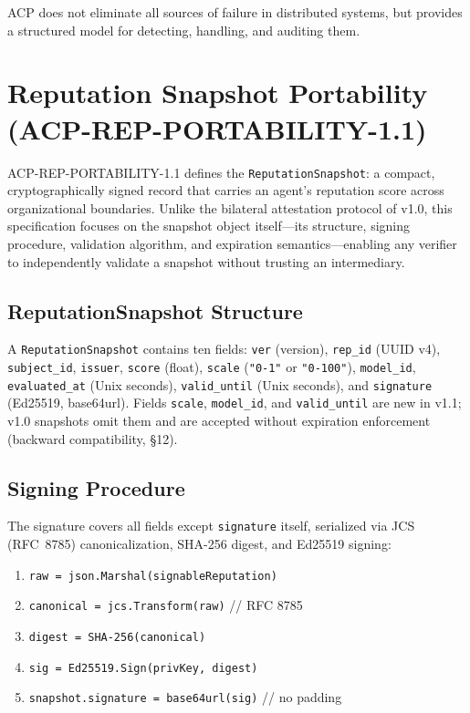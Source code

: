 \documentclass[11pt]{article}
\theoremstyle{definition}
\begin{document}
ACP does not eliminate all sources of failure in distributed systems,
but provides a structured model for detecting, handling, and auditing them.

\section{Reputation Snapshot Portability (ACP-REP-PORTABILITY-1.1)}

ACP-REP-PORTABILITY-1.1 defines the \texttt{ReputationSnapshot}: a compact, cryptographically signed record that carries an agent's reputation score across organizational boundaries.
Unlike the bilateral attestation protocol of v1.0, this specification focuses on the snapshot object itself---its structure, signing procedure, validation algorithm, and expiration semantics---enabling any verifier to independently validate a snapshot without trusting an intermediary.

\subsection{ReputationSnapshot Structure}

A \texttt{ReputationSnapshot} contains ten fields: \texttt{ver} (version), \texttt{rep\_id} (UUID v4), \texttt{subject\_id}, \texttt{issuer}, \texttt{score} (float), \texttt{scale} (\texttt{"0-1"} or \texttt{"0-100"}), \texttt{model\_id}, \texttt{evaluated\_at} (Unix seconds), \texttt{valid\_until} (Unix seconds), and \texttt{signature} (Ed25519, base64url).
Fields \texttt{scale}, \texttt{model\_id}, and \texttt{valid\_until} are new in v1.1; v1.0 snapshots omit them and are accepted without expiration enforcement (backward compatibility, §12).

\subsection{Signing Procedure}

The signature covers all fields except \texttt{signature} itself, serialized via JCS (RFC~8785) canonicalization, SHA-256 digest, and Ed25519 signing:

\begin{enumerate}[noitemsep]
  \item \texttt{raw = json.Marshal(signableReputation)}
  \item \texttt{canonical = jcs.Transform(raw)} \hfill // RFC 8785
  \item \texttt{digest = SHA-256(canonical)}
  \item \texttt{sig = Ed25519.Sign(privKey, digest)}
  \item \texttt{snapshot.signature = base64url(sig)} \hfill // no padding
\end{enumerate}
\end{document}

